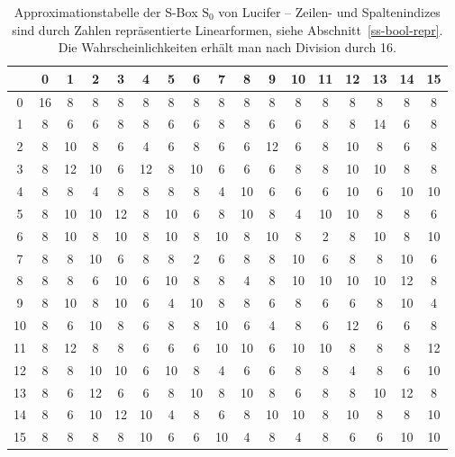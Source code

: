 \begin{refsegment}
\begin{table}
\begin{center}
\begin{tabular}{|c|cccccccccccccccc|} \hline
     & 0 & 1 & 2 & 3 & 4 & 5 & 6 & 7 & 8 & 9 &10 &11 &12 &13 &14 &15 \\ \hline
   0 &16 & 8 & 8 & 8 & 8 & 8 & 8 & 8 & 8 & 8 & 8 & 8 & 8 & 8 & 8 & 8 \\
   1 & 8 & 6 & 6 & 8 & 8 & 6 & 6 & 8 & 8 & 6 & 6 & 8 & 8 &14 & 6 & 8 \\
   2 & 8 &10 & 8 & 6 & 4 & 6 & 8 & 6 & 6 &12 & 6 & 8 &10 & 8 & 6 & 8 \\
   3 & 8 &12 &10 & 6 &12 & 8 &10 & 6 & 6 & 6 & 8 & 8 &10 &10 & 8 & 8 \\
   4 & 8 & 8 & 4 & 8 & 8 & 8 & 8 & 4 &10 & 6 & 6 & 6 &10 & 6 &10 &10 \\
   5 & 8 &10 &10 &12 & 8 &10 & 6 & 8 &10 & 8 & 4 &10 &10 & 8 & 8 & 6 \\
   6 & 8 &10 & 8 &10 & 8 &10 & 8 &10 & 8 &10 & 8 & 2 & 8 &10 & 8 &10 \\
   7 & 8 & 8 &10 & 6 & 8 & 8 & 2 & 6 & 8 & 8 &10 & 6 & 8 & 8 &10 & 6 \\
   8 & 8 & 8 & 6 &10 & 6 &10 & 8 & 8 & 4 & 8 &10 &10 &10 &10 &12 & 8 \\
   9 & 8 &10 & 8 &10 & 6 & 4 &10 & 8 & 8 & 6 & 8 & 6 & 6 & 8 &10 & 4 \\
  10 & 8 & 6 &10 & 8 & 6 & 8 & 8 &10 & 6 & 4 & 8 & 6 &12 & 6 & 6 & 8 \\
  11 & 8 &12 & 8 & 8 & 6 & 6 & 6 &10 &10 & 6 &10 &10 & 8 & 8 & 8 &12 \\
  12 & 8 & 8 &10 &10 & 6 &10 & 8 & 4 & 6 & 6 & 8 & 8 & 4 & 8 & 6 &10 \\
  13 & 8 & 6 &12 & 6 & 6 & 8 &10 & 8 &10 & 8 & 6 & 8 & 8 &10 &12 & 8 \\
  14 & 8 & 6 &10 &12 &10 & 4 & 8 & 6 & 8 &10 &10 & 8 &10 & 8 & 8 &10 \\
  15 & 8 & 8 & 8 & 8 &10 & 6 & 6 &10 & 4 & 8 & 4 & 8 & 6 & 6 &10 &10 \\ \hline
\end{tabular}
\end{center}
\caption{Approximationstabelle der S-Box $\mathrm{S}_0$ von {\sc Lucifer} --
   Zeilen- und Spaltenindizes sind durch Zahlen repräsentierte Linearformen,
   siehe Abschnitt~\ref{ss-bool-repr}.
   Die Wahrscheinlichkeiten erhält man nach Division durch 16.}\label{tab-bool-s0}
\end{table}


\end{refsegment}
